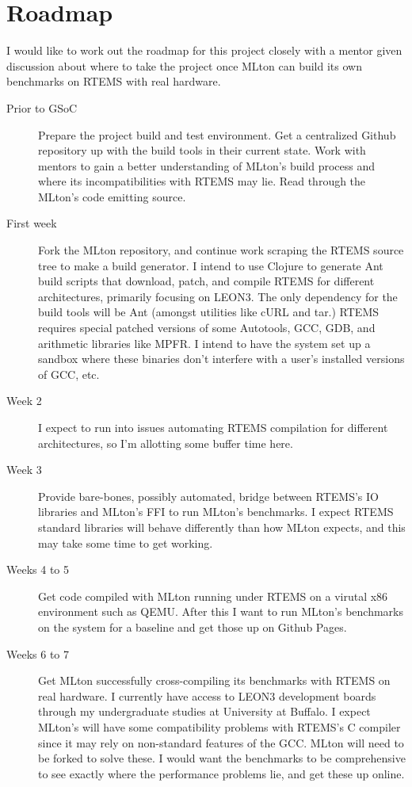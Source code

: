 \documentclass[12pt]{article}
\begin{document}
\section{Roadmap}
I would like to work out the roadmap for this project closely with a mentor given discussion about where to take the project once MLton can build its own benchmarks on RTEMS with real hardware.
\begin{description}

\item[Prior to GSoC] Prepare the project build and test environment. Get a centralized Github repository up with the build tools in their current state. Work with mentors to gain a better understanding of MLton's build process and where its incompatibilities with RTEMS may lie. Read through the MLton's code emitting source.

\item[First week] Fork the MLton repository, and continue work scraping the RTEMS source tree to make a build generator. I intend to use Clojure to generate Ant build scripts that download, patch, and compile RTEMS for different architectures, primarily focusing on LEON3. The only dependency for the build tools will be Ant (amongst utilities like cURL and tar.) RTEMS requires special patched versions of some Autotools, GCC, GDB, and arithmetic libraries like MPFR. I intend to have the system set up a sandbox where these binaries don't interfere with a user's installed versions of GCC, etc.
\item[Week 2] I expect to run into issues automating RTEMS compilation for different architectures, so I'm allotting some buffer time here.

\item[Week 3] Provide bare-bones, possibly automated, bridge between RTEMS's IO libraries and MLton's FFI to run MLton's benchmarks. I expect RTEMS standard libraries will behave differently than how MLton expects, and this may take some time to get working.
\item[Weeks 4 to 5] Get code compiled with MLton running under RTEMS on a virutal x86 environment such as QEMU. After this I want to run MLton's benchmarks on the system for a baseline and get those up on Github Pages. 
\item[Weeks 6 to 7] Get MLton successfully cross-compiling its benchmarks with RTEMS on real hardware. I currently have access to LEON3 development boards through my undergraduate studies at University at Buffalo. I expect MLton's will have some compatibility problems with RTEMS's C compiler since it may rely on non-standard features of the GCC. MLton will need to be forked to solve these. I would want the benchmarks to be comprehensive to see exactly where the performance problems lie, and get these up online.


\end{description}
\end{document}
